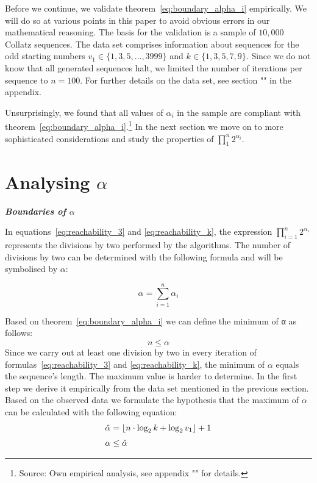 \documentclass{SciPress_2015}
\renewcommand{\subsection}[1]{\textit{\textbf{#1}}}
\begin{document}
Before we continue, we validate theorem~\ref{eq:boundary_alpha_i} empirically. We will do so at various points in this paper to avoid obvious errors in our mathematical reasoning. The basis for the validation is a sample of $10,000$ Collatz sequences. The data set comprises information about sequences for the odd starting numbers $v_1\in\{1,3,5,\ldots,3999\}$ and $k\in\{1,3,5,7,9\}$. Since we do not know that all generated sequences halt, we limited the number of iterations per sequence to $n=100$. For further details on the data set, see section "" in the appendix.

Unsurprisingly, we found that all values of $\alpha_i$ in the sample are compliant with theorem~\ref{eq:boundary_alpha_i}.\footnote{Source: Own empirical analysis, see appendix "" for details.} In the next section we move on to more sophisticated considerations and study the properties of $\prod_{1}^{n}2^{\alpha_i}$.

\section{Analysing \boldmath$\alpha$}
\label{sec:analysing_alpha}
\subsection{Boundaries of \boldmath$\alpha$}
\par\noindent
In equations~\ref{eq:reachability_3} and \ref{eq:reachability_k}, the expression $\prod_{i=1}^{n}2^{\alpha_i}$ represents the divisions by two performed by the algorithms. The number of divisions by two can be determined with the following formula and will be symbolised by $\alpha$:

\[
\alpha=\sum_{i=1}^{n}{\alpha_i}
\]

\newpage
\par\noindent
Based on theorem~\ref{eq:boundary_alpha_i} we can define the minimum of α as follows:
\[
n\le \alpha
\]
Since we carry out at least one division by two in every iteration of formulas~\ref{eq:reachability_3} and \ref{eq:reachability_k}, the minimum of $\alpha$ equals the sequence's length. The maximum value is harder to determine. In the first step we derive it empirically from the data set mentioned in the previous section. Based on the observed data we formulate the hypothesis that the maximum of $\alpha$ can be calculated with the following equation:
\begin{equation}
\label{eq:max_alpha}
\begin{array}{l}
\hat\alpha=\lfloor n\cdot\log_2k+\log_2v_1\rfloor+1\\[\medskipamount]
\alpha\le\hat\alpha
\end{array}
\end{equation}
\end{document}
